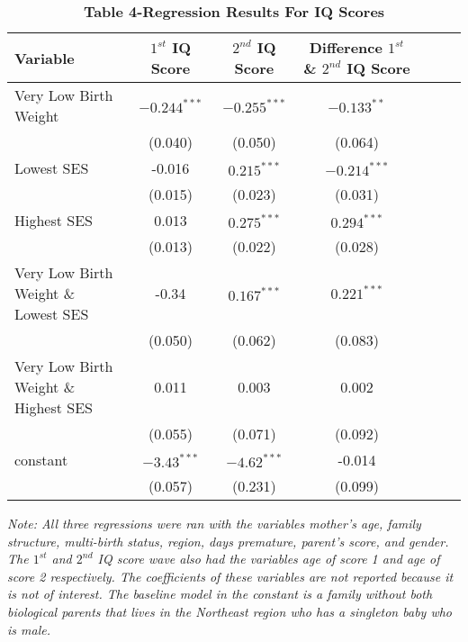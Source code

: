 \documentclass{article}
\begin{document}
\begin{table}[H]
\centering 
\setlength\extrarowheight{-9pt}
	
\begin{threeparttable} 
	
	\singlespace
	  \caption*{\textbf{Table 4-Regression Results For IQ Scores}}
	  
		\begin{tabular}{l*{6}{c}}

\hline\hline
Variable & $1^{st}$ IQ Score & $2^{nd}$ IQ Score & Difference $1^{st}$ \& $2^{nd}$ IQ Score  \\
\hline
Very Low Birth Weight & $-0.244^{***}$ & $-0.255^{***}$ & $-0.133^{**}$ \\
& (0.040) & (0.050) & (0.064)\\
Lowest SES & -0.016 & $0.215^{***}$ & $-0.214^{***}$ \\
& (0.015) & (0.023) & (0.031) \\
Highest SES & 0.013 & $0.275^{***}$ & $0.294^{***}$ \\
& (0.013) & (0.022) & (0.028) \\
Very Low Birth Weight \& Lowest SES & -0.34 & $0.167^{***}$ & 0.$221^{***}$ \\
& (0.050) & (0.062) & (0.083) \\
Very Low Birth Weight \& Highest SES & 0.011 & 0.003 & 0.002\\
& (0.055) & (0.071) & (0.092) \\
constant & $-3.43^{***}$ & $-4.62^{***}$ & -0.014 \\
& (0.057) & (0.231) & (0.099) \\
\hline

	\end{tabular}
	
\begin{tablenotes}[center]

      \small
      \singlespace
      \item
      \textit{\footnotesize{{Note}: All three regressions were ran with the variables mother's age, family structure, multi-birth status, region, days premature, parent's score, and gender. The $1^{st}$ and $2^{nd}$ IQ score wave also had the variables age of score 1 and age of score 2 respectively. The coefficients of these variables are not reported because it is not of interest. The baseline model in the constant is a family without both biological parents that lives in the Northeast region who has a singleton baby who is male.}}   
      
\end{tablenotes}		
	
\end{threeparttable}	
	
	\end{table}
	
\end{document}
